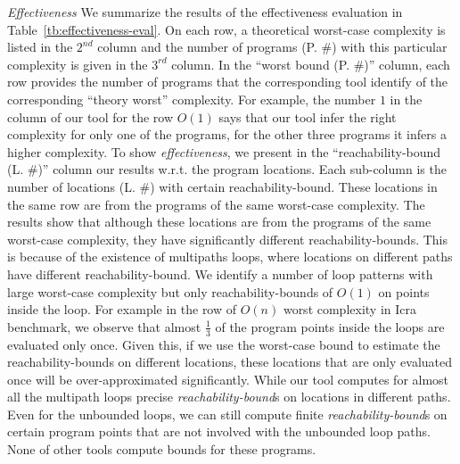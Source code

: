 \emph{Effectiveness}
We summarize the results of the effectiveness evaluation in Table~\ref{tb:effectiveness-eval}.
On each row, a theoretical worst-case complexity is listed in the $2^{nd}$ column and the number of programs (P. \#) with this particular complexity is given in the $3^{rd}$ column.
In the ``worst bound (P. \#)'' column, each row provides the number of programs that the corresponding tool identify of the  corresponding ``theory worst'' complexity. For example, the number $1$ in the column of our tool for the row $O(1)$ says that our tool infer the right complexity for only one of the programs, for the other three programs it infers a higher complexity.
To show \textit{effectiveness}, 
we present in the ``{reachability-bound (L. \#)}'' column our results w.r.t. the program locations. 
Each sub-column is the number of locations (L. \#) with certain reachability-bound.
These locations in the same row are from the programs of the same worst-case complexity.
The results show that although these locations are from the programs of the same worst-case complexity, they have significantly different reachability-bounds. This is because of the existence of multipaths loops, where locations on different paths have different reachability-bound.
We identify a number of loop patterns with large worst-case complexity but only reachability-bounds of $O(1)$ on points inside the loop.
For example in the row of $O(n)$ worst complexity in Icra benchmark, we observe that
almost $\frac{1}{3}$ of the program points inside the loops are evaluated only once.
Given this, if we use the worst-case bound to estimate the reachability-bounds on different locations, these locations that are only evaluated once will be over-approximated significantly. 
While our tool computes for almost all the multipath loops precise \emph{reachability-bound}s on locations in different paths.
Even for the unbounded loops, we can still compute finite \emph{reachability-bound}s on certain program points that are not involved with the unbounded loop paths.
None of other tools compute bounds for these programs.
\\
